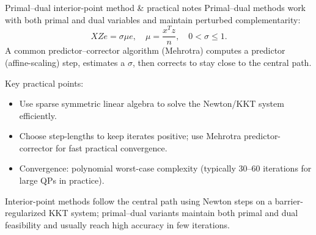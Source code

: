 \begin{frame}{Primal--dual interior-point method \& practical notes}
Primal--dual methods work with both primal and dual variables and maintain perturbed complementarity:
\[XZ e = \sigma \mu e,\quad \mu=\frac{x^T z}{n},\quad 0<\sigma\le1.
\]
A common predictor--corrector algorithm (Mehrotra) computes a predictor (affine-scaling) step, estimates a \(\sigma\), then corrects to stay close to the central path.

Key practical points:
\begin{itemize}
  \item Use sparse symmetric linear algebra to solve the Newton/KKT system efficiently.
  \item Choose step-lengths to keep iterates positive; use Mehrotra predictor-corrector for fast practical convergence.
  \item Convergence: polynomial worst-case complexity (typically 30--60 iterations for large QPs in practice).
\end{itemize}

Interior-point methods follow the central path using Newton steps on a barrier-regularized KKT system; primal--dual variants maintain both primal and dual feasibility and usually reach high accuracy in few iterations.
\end{frame}

\onput
